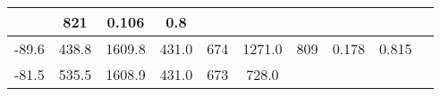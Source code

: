 \documentclass[a4paper,10pt]{article}
\begin{document}
\begin{longtable}{
     |
%    
    c|
%    
    c|
%    
    c|
%    
    c|
%    
    c|
%    
    c|
%    
    c|
%    
    c|
%    
    c|
%    
    c|
%    
    }
%        
        & 821
%        

%        

%        
        & 0.106
%        

%        

%        
        & 0.8
%        

%        
        \\
        \hline

        

%        

%        
        -89.6
%        

%        

%        
        & 438.8
%        

%        

%        
        & 1609.8
%        

%        

%        
        & 431.0
%        

%        

%        
        & 674
%        

%        

%        
        & 1271.0
%        

%        

%        
        & 809
%        

%        

%        
        & 0.178
%        

%        

%        
        & 0.815
%        

%        
        \\
        \hline

        

%        

%        
        -81.5
%        

%        

%        
        & 535.5
%        

%        

%        
        & 1608.9
%        

%        

%        
        & 431.0
%        

%        

%        
        & 673
%        

%        

%        
        & 728.0
%        

%        


\end{longtable}
\end{document}
